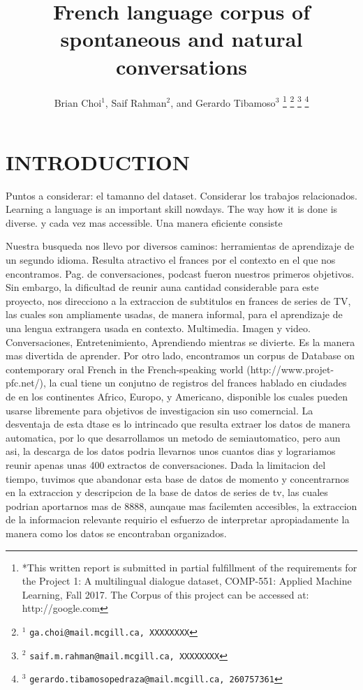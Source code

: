 \documentclass[letterpaper, 10 pt, conference]{ieeeconf}  %
\title{\LARGE \bf
French language corpus of spontaneous and natural conversations
}
\author{Brian Choi$^{1}$, Saif Rahman$^{2}$, and Gerardo Tibamoso$^{3}$%
\thanks{*This written report is submitted in partial fulfillment of the requirements for the Project 1: A multilingual dialogue dataset, COMP-551: Applied Machine Learning, Fall 2017. The Corpus of this project can be accessed at: http://google.com} %
\thanks{$^{1}$ {\tt\small ga.choi@mail.mcgill.ca, XXXXXXXX}}%
\thanks{$^{2}$ {\tt\small saif.m.rahman@mail.mcgill.ca, XXXXXXXX}}%
\thanks{$^{3}$ {\tt\small gerardo.tibamosopedraza@mail.mcgill.ca, 260757361}}%
}
\begin{document}
\maketitle
\thispagestyle{empty}
\pagestyle{empty}


\begin{abstract}


\end{abstract}


\section{INTRODUCTION}

Puntos a considerar: el tamanno del dataset. Considerar los trabajos relacionados.
Learning a language is an important skill nowdays. The way how it is done is diverse. y cada vez mas accessible. Una manera eficiente consiste 

Nuestra busqueda nos llevo por diversos caminos: herramientas de aprendizaje de un segundo idioma. Resulta atractivo el frances por el contexto en el que nos encontramos. Pag. de conversaciones, podcast fueron nuestros primeros objetivos. Sin embargo, la dificultad de reunir auna cantidad considerable para este proyecto, nos direcciono a la extraccion de subtitulos en frances de series de TV, las cuales son ampliamente usadas, de manera informal, para el aprendizaje de una lengua extrangera usada en contexto. Multimedia. Imagen y video. Conversaciones, Entretenimiento, Aprendiendo mientras se divierte. Es la manera mas divertida de aprender. Por otro lado, encontramos un corpus de Database on contemporary oral French in the French-speaking world (http://www.projet-pfc.net/), la cual tiene un conjutno de registros del frances hablado en ciudades de en los continentes Africo, Europo, y Americano, disponible los cuales pueden usarse libremente para objetivos de investigacion sin uso comerncial. La desventaja de esta dtase es lo intrincado que resulta extraer los datos de manera automatica, por lo que desarrollamos un metodo de semiautomatico, pero aun asi, la descarga de los datos podria llevarnos unos cuantos dias y lograriamos reunir  apenas unas 400 extractos de conversaciones. Dada la limitacion del tiempo, tuvimos que abandonar esta base de datos de momento y concentrarnos en la extraccion y descripcion de la base de datos de series de tv, las cuales podrian aportarnos mas de $8888$, aunqaue mas facilemten accesibles, la extraccion de la informacion relevante requirio el esfuerzo de interpretar apropiadamente la manera como los datos se encontraban organizados.
\end{document}
